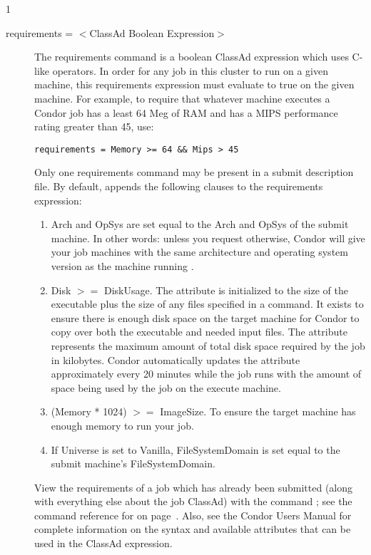 \begin{ManPage}{\label{man-condor-submit}}{1}
\begin{description}

\item[requirements = $<$ClassAd Boolean Expression$>$]
The requirements
command is a boolean ClassAd expression which uses C-like operators. In
order for any job in this cluster to run on a given machine, this
requirements expression must evaluate to true on the given machine. For
example, to require that whatever machine executes a Condor job has a
least 64 Meg of RAM and has a MIPS performance rating greater than 45,
use:
\begin{verbatim}
requirements = Memory >= 64 && Mips > 45
\end{verbatim}
Only one requirements command may be present in a
submit description file.
By default,  appends the following clauses to
the requirements expression:
\begin{enumerate}
        \item Arch and OpSys are set equal to the Arch and OpSys of the
submit machine.  In other words: unless you request otherwise, Condor will give your
job machines with the same architecture and operating system version as
the machine running .
        \item Disk $>=$ DiskUsage.
The  attribute is initialized to the size of the
executable plus the size of any files specified in a
 command.
It exists to ensure there is enough disk space on the
target machine for Condor to copy over both the executable
and needed input files.
The  attribute represents the maximum amount of
total disk space required by the job in kilobytes.
Condor automatically updates the  attribute
approximately every 20 minutes while the job runs with the
amount of space being used by the job on the execute machine.
        \item (Memory * 1024) $>=$ ImageSize.  To ensure the target machine
has enough memory to run your job.
        \item If Universe is set to Vanilla, FileSystemDomain is set equal to
the submit machine's FileSystemDomain.
\end{enumerate}
View the requirements of a job
which has already been submitted (along with everything else about the
job ClassAd) with the command ; see the command reference for
 on page~\pageref{man-condor-q}.  Also, see the Condor Users
Manual for complete information on the syntax and available attributes
that can be used in the ClassAd expression.



\end{description}
\end{ManPage}

